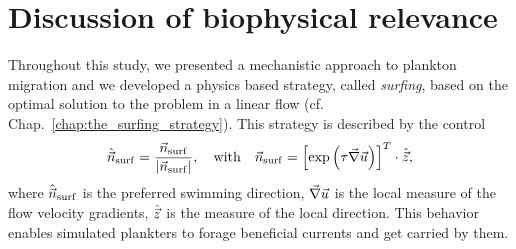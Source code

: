 \chapter{Discussion of biophysical relevance}\label{chap:bio_discussion}

Throughout this study, we presented a mechanistic approach to plankton migration and we developed a physics based strategy, called \textit{surfing}, based on the optimal solution to the problem in a linear flow (cf. Chap.~\ref{chap:the_surfing_strategy}).
This strategy is described by the control
\begin{equation}
	\label{end:eq:surfing_swimming_direction_final}
	\hat{\vec{n}}_{\mathrm{surf}} = \frac{\vec{n}_{\mathrm{surf}}}{\lvert\vec{n}_{\mathrm{surf}}\rvert}, \quad \text{with} \quad \vec{n}_{\mathrm{surf}} = \left[ \exp \left( \tau \vec{\nabla} \vec{u} \right) \right]^T \cdot \hat{\vec{z}},
\end{equation}
where $\hat{\vec{n}}_{\mathrm{surf}}$ is the preferred swimming direction, $\vec{\nabla} \vec{u}$ is the local measure of the flow velocity gradients, $\hat{\vec{z}}$ is the measure of the local direction.
This behavior enables simulated plankters to forage beneficial currents and get carried by them.


